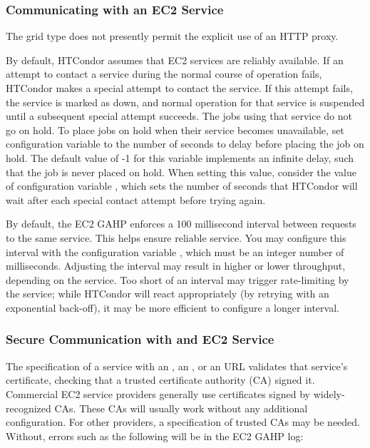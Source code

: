\subsubsection{\label{sec:Amazon-config-communication}Communicating with an EC2 Service}

The  grid type does not presently permit the explicit
use of an HTTP proxy.

By default, HTCondor assumes that EC2 services are reliably available.
If an attempt to contact a service during the normal course of operation fails,
HTCondor makes a special attempt to contact the service.
If this attempt fails, the service is marked as down,
and normal operation for that service is
suspended until a subsequent special attempt succeeds.
The jobs using that service do not go on hold.
To place jobs on hold when their service becomes unavailable,
set configuration variable  to
the number of seconds to delay before placing the job on hold.
The default value of -1 for this variable implements
an infinite delay, such that the job is never placed on hold.
When setting this value, consider the value of configuration variable
,
which sets the number of seconds that HTCondor will wait after each
special contact attempt before trying again.

By default, the EC2 GAHP enforces a 100 millisecond interval between requests
to the same service.  This helps ensure reliable service.  You may configure
this interval with the configuration variable ,
which must be an integer number of milliseconds.  Adjusting the interval may
result in higher or lower throughput, depending on the service.  Too short
of an interval may trigger rate-limiting by the service; while HTCondor will
react appropriately (by retrying with an exponential back-off), it may be
more efficient to configure a longer interval.

\subsubsection{\label{sec:Amazon-config-certs}Secure Communication with and EC2 Service}

The specification of a service with an , an ,
or an  URL validates that service's certificate,
checking that a trusted certificate authority (CA) signed it.
Commercial EC2 service providers generally use certificates signed by
widely-recognized CAs.
These CAs will usually work without any additional configuration.
For other providers, a specification of trusted CAs may be needed.
Without, errors such as the following will be in the EC2 GAHP log:

